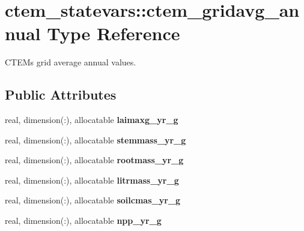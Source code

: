 \hypertarget{structctem__statevars_1_1ctem__gridavg__annual}{}\section{ctem\+\_\+statevars\+:\+:ctem\+\_\+gridavg\+\_\+annual Type Reference}
\label{structctem__statevars_1_1ctem__gridavg__annual}


C\+T\+E\+M\textquotesingle{}s grid average annual values.  


\subsection*{Public Attributes}
\begin{DoxyCompactItemize}
\item 
\hypertarget{structctem__statevars_1_1ctem__gridavg__annual_aa0fb877a9bff6828ada07af3fdc3447d}{}real, dimension(\+:), allocatable {\bfseries laimaxg\+\_\+yr\+\_\+g}\label{structctem__statevars_1_1ctem__gridavg__annual_aa0fb877a9bff6828ada07af3fdc3447d}

\item 
\hypertarget{structctem__statevars_1_1ctem__gridavg__annual_a9c5a5836895693a5b3a8a3ffcd95d850}{}real, dimension(\+:), allocatable {\bfseries stemmass\+\_\+yr\+\_\+g}\label{structctem__statevars_1_1ctem__gridavg__annual_a9c5a5836895693a5b3a8a3ffcd95d850}

\item 
\hypertarget{structctem__statevars_1_1ctem__gridavg__annual_abd31c136ba6ca058a9ba55c9ef30fa40}{}real, dimension(\+:), allocatable {\bfseries rootmass\+\_\+yr\+\_\+g}\label{structctem__statevars_1_1ctem__gridavg__annual_abd31c136ba6ca058a9ba55c9ef30fa40}

\item 
\hypertarget{structctem__statevars_1_1ctem__gridavg__annual_a4ed1a40f5b9860acea8bd5a1e52e1c39}{}real, dimension(\+:), allocatable {\bfseries litrmass\+\_\+yr\+\_\+g}\label{structctem__statevars_1_1ctem__gridavg__annual_a4ed1a40f5b9860acea8bd5a1e52e1c39}

\item 
\hypertarget{structctem__statevars_1_1ctem__gridavg__annual_a407c5145b70282fd23328db089b46830}{}real, dimension(\+:), allocatable {\bfseries soilcmas\+\_\+yr\+\_\+g}\label{structctem__statevars_1_1ctem__gridavg__annual_a407c5145b70282fd23328db089b46830}

\item 
\hypertarget{structctem__statevars_1_1ctem__gridavg__annual_ac79c5486bd2644e3af367ec1884cbf59}{}real, dimension(\+:), allocatable {\bfseries npp\+\_\+yr\+\_\+g}\label{structctem__statevars_1_1ctem__gridavg__annual_ac79c5486bd2644e3af367ec1884cbf59}


\end{DoxyCompactItemize}
